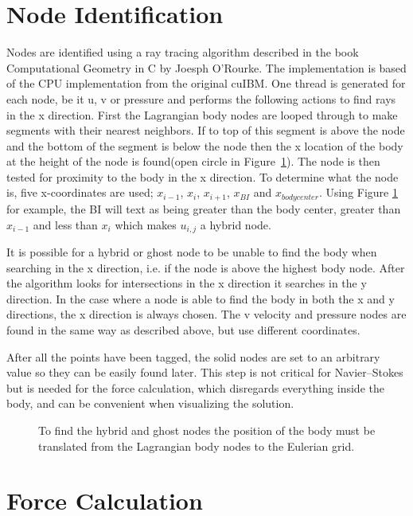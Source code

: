 \section{Node Identification}
Nodes are identified using a ray tracing algorithm described in the book Computational Geometry in C by Joesph O'Rourke\cite{o1998computational}.
The implementation is based of the CPU implementation from the original cuIBM\cite{krishnan2012validation}. 
One thread is generated for each node, be it u, v or pressure and performs the following actions to find rays in the x direction.
First the Lagrangian body nodes are looped through to make segments with their nearest neighbors.
If to top of this segment is above the node and the bottom of the segment is below the node then the x location of the body at the height of the node is found(open circle in Figure~\ref{fig:node id 1}).
The node is then tested for proximity to the body in the x direction. 
To determine what the node is, five x-coordinates are used; $x_{i-1}$, $x_{i}$, $x_{i+1}$, $x_{BI}$ and $x_{body center}$. 
Using Figure \ref{fig:node id 1} for example, the BI will text as being greater than the body center, greater than $x_{i-1}$ and less than $x_{i}$ which makes $u_{i,j}$ a hybrid node. 

It is possible for a hybrid or ghost node to be unable to find the body when searching in the x direction, i.e. if the node is above the highest body node.
After the algorithm looks for intersections in the x direction it searches in the y direction.
In the case where a node is able to find the body in both the x and y directions, the x direction is always chosen. 
The v velocity and pressure nodes are found in the same way as described above, but use different coordinates.

After all the points have been tagged, the solid nodes are set to an arbitrary value so they can be easily found later.
This step is not critical for Navier--Stokes but is needed for the force calculation, which disregards everything inside the body, and can be convenient when visualizing the solution.
\begin{figure}
	\centering
	
	\caption{To find the hybrid and ghost nodes the position of the body must be translated from the Lagrangian body nodes to the Eulerian grid.}
	\label{fig:node id 1}
\end{figure}

\section{Force Calculation}
\label{Force Calculation}

